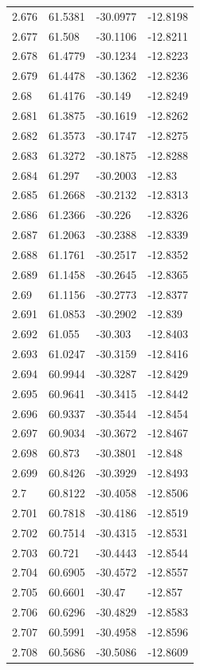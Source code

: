 \begin{tabular}{llll}
2.676 & 61.5381 & -30.0977 & -12.8198 \\
2.677 & 61.508 & -30.1106 & -12.8211 \\
2.678 & 61.4779 & -30.1234 & -12.8223 \\
2.679 & 61.4478 & -30.1362 & -12.8236 \\
2.68 & 61.4176 & -30.149 & -12.8249 \\
2.681 & 61.3875 & -30.1619 & -12.8262 \\
2.682 & 61.3573 & -30.1747 & -12.8275 \\
2.683 & 61.3272 & -30.1875 & -12.8288 \\
2.684 & 61.297 & -30.2003 & -12.83 \\
2.685 & 61.2668 & -30.2132 & -12.8313 \\
2.686 & 61.2366 & -30.226 & -12.8326 \\
2.687 & 61.2063 & -30.2388 & -12.8339 \\
2.688 & 61.1761 & -30.2517 & -12.8352 \\
2.689 & 61.1458 & -30.2645 & -12.8365 \\
2.69 & 61.1156 & -30.2773 & -12.8377 \\
2.691 & 61.0853 & -30.2902 & -12.839 \\
2.692 & 61.055 & -30.303 & -12.8403 \\
2.693 & 61.0247 & -30.3159 & -12.8416 \\
2.694 & 60.9944 & -30.3287 & -12.8429 \\
2.695 & 60.9641 & -30.3415 & -12.8442 \\
2.696 & 60.9337 & -30.3544 & -12.8454 \\
2.697 & 60.9034 & -30.3672 & -12.8467 \\
2.698 & 60.873 & -30.3801 & -12.848 \\
2.699 & 60.8426 & -30.3929 & -12.8493 \\
2.7 & 60.8122 & -30.4058 & -12.8506 \\
2.701 & 60.7818 & -30.4186 & -12.8519 \\
2.702 & 60.7514 & -30.4315 & -12.8531 \\
2.703 & 60.721 & -30.4443 & -12.8544 \\
2.704 & 60.6905 & -30.4572 & -12.8557 \\
2.705 & 60.6601 & -30.47 & -12.857 \\
2.706 & 60.6296 & -30.4829 & -12.8583 \\
2.707 & 60.5991 & -30.4958 & -12.8596 \\
2.708 & 60.5686 & -30.5086 & -12.8609 \\

\end{tabular}
